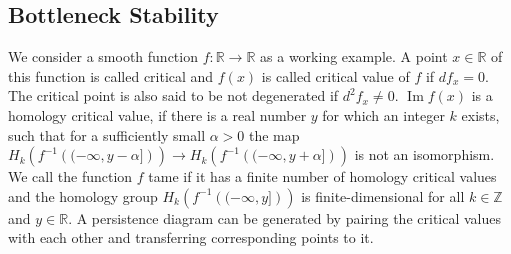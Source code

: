 \documentclass{article}
\DeclareMathOperator{\Ima}{\text{Im}}
\begin{document}
\subsection{Bottleneck Stability}
We consider a smooth function $f: \mathbb{R} \rightarrow \mathbb{R}$ as a working example. A point $x \in \mathbb{R}$ of this function is called critical and $f(x)$ is called critical value of $f$ if $df_x = 0$. The critical point is also said to be not degenerated if $d^2f_x \neq 0$. $\Ima f(x)$ is a homology critical value, if there is a real number $y$ for which an integer $k$ exists, such that for a sufficiently small $\alpha > 0$ the map $H_k\left(f^{-1}\left((-\infty,y-\alpha]\right)\right)\rightarrow H_k\left(f^{-1}\left((-\infty,y+\alpha]\right)\right)$ is not an isomorphism. We call the function $f$ tame if it has a finite number of homology critical values and the homology group $H_k\left(f^{-1}\left((-\infty,y]\right)\right)$ is finite-dimensional for all $k\in \mathbb{Z}$ and $y \in \mathbb{R}$. A persistence diagram can be generated by pairing the critical values with each other and transferring corresponding points to it.
\end{document}
